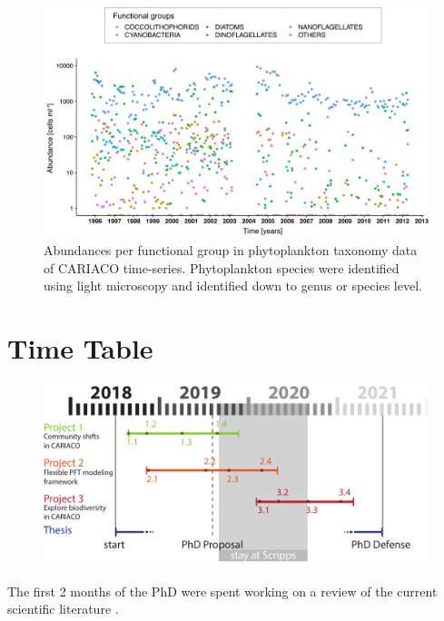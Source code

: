 \begin{figure}
\centering
\includegraphics[trim = 0mm 0mm 0mm 0mm, clip, width=1.\linewidth]{./Chp3-Further/AbundancesAsset111.png}
\caption[Scheme]{\small {Abundances per functional group in phytoplankton taxonomy data of CARIACO time-series. Phytoplankton species were identified using light microscopy and identified down to genus or species level.}}
\label{Abundances}
\end{figure}



\section{Time Table}

\begin{figure}[h]
\centering
\includegraphics[trim = 0mm 0mm 0mm 0mm, clip, width=1.1\linewidth]{./Chp3-Further/TimePlanAsset1.pdf}

\end{figure}


The first 2 months of the PhD were spent working on a review of the current scientific literature .


